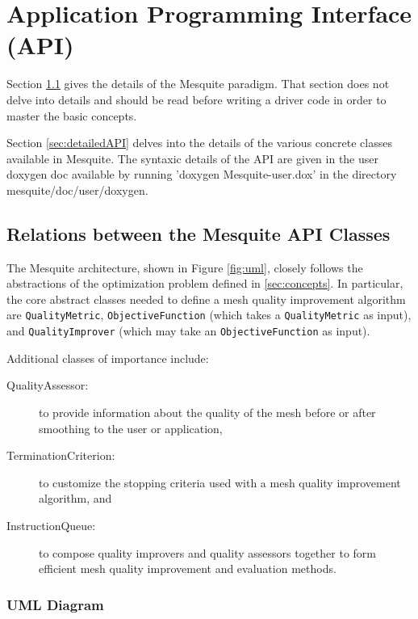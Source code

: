 \chapter{Application Programming Interface (API)} \label{sec:API}

Section \ref{sec:classesRelations} gives the details of the Mesquite paradigm. That section does not
delve into details and should be read before writing a driver code in order to master the basic
concepts. 

Section \ref{sec:detailedAPI} delves into the details of the various concrete classes available in
Mesquite. The syntaxic details of the API are given in the user doxygen doc available by running
'doxygen Mesquite-user.dox' in the directory mesquite/doc/user/doxygen. 

\section{Relations between the Mesquite API Classes} \label{sec:classesRelations}

The Mesquite architecture, shown in Figure \ref{fig:uml}, closely
follows the abstractions of the optimization problem defined in \ref{sec:concepts}.
In particular, the core abstract classes needed to
define a mesh quality improvement algorithm are {\tt QualityMetric},
{\tt ObjectiveFunction} (which takes a {\tt QualityMetric} as
input), and {\tt QualityImprover} (which may take an {\tt ObjectiveFunction}
as input).

Additional classes of importance include:
\begin{description}
\item[QualityAssessor:] to provide information about the
quality of the mesh before or after smoothing to the user or application,
\item[TerminationCriterion:] to customize the stopping criteria
used with a mesh quality improvement algorithm, and
\item[InstructionQueue:] to compose quality improvers and
quality assessors together to form efficient mesh quality improvement
and evaluation methods.
\end{description}

\subsection{UML Diagram}

